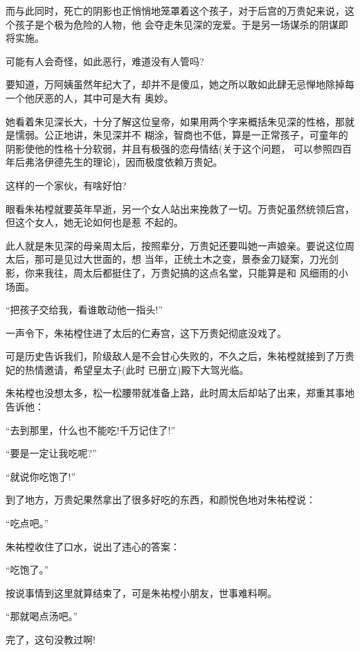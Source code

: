 \documentclass[11pt,a4paper,onecolumn]{article}
\begin{document}
而与此同时，死亡的阴影也正悄悄地笼罩着这个孩子，对于后宫的万贵妃来说，这个孩子是个极为危险的人物，他
会夺走朱见深的宠爱。于是另一场谋杀的阴谋即将实施。

可能有人会奇怪，如此恶行，难道没有人管吗?

要知道，万阿姨虽然年纪大了，却并不是傻瓜，她之所以敢如此肆无忌惮地除掉每一个他厌恶的人，其中可是大有
奥妙。

她看着朱见深长大，十分了解这位皇帝，如果用两个字来概括朱见深的性格，那就是懦弱。公正地讲，朱见深并不
糊涂，智商也不低，算是一正常孩子，可童年的阴影使他的性格十分软弱，并且有极强的恋母情结(关于这个问题，
可以参照四百年后弗洛伊德先生的理论)，因而极度依赖万贵妃。

这样的一个家伙，有啥好怕?

眼看朱祐樘就要英年早逝，另一个女人站出来挽救了一切。万贵妃虽然统领后宫，但这个女人，她无论如何也是惹
不起的。

此人就是朱见深的母亲周太后，按照辈分，万贵妃还要叫她一声娘亲。要说这位周太后，那可是见过大世面的，想
当年，正统土木之变，景泰金刀疑案，刀光剑影，你来我往，周太后都挺住了，万贵妃搞的这点名堂，只能算是和
风细雨的小场面。

``把孩子交给我，看谁敢动他一指头!''

一声令下，朱祐樘住进了太后的仁寿宫，这下万贵妃彻底没戏了。

可是历史告诉我们，阶级敌人是不会甘心失败的，不久之后，朱祐樘就接到了万贵妃的热情邀请，希望皇太子(此时
已册立)殿下大驾光临。

朱祐樘也没想太多，松一松腰带就准备上路，此时周太后却站了出来，郑重其事地告诉他：

``去到那里，什么也不能吃!千万记住了!''

``要是一定让我吃呢?''

``就说你吃饱了!''

到了地方，万贵妃果然拿出了很多好吃的东西，和颜悦色地对朱祐樘说：

``吃点吧。''

朱祐樘收住了口水，说出了违心的答案：

``吃饱了。''

按说事情到这里就算结束了，可是朱祐樘小朋友，世事难料啊。

``那就喝点汤吧。''

完了，这句没教过啊!

\section[\thesection]{}
\end{document}
